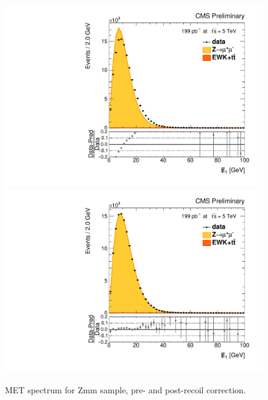 \begin{figure}
\centering
\includegraphics[width=0.49\linewidth]{plots/Recoil/close_nocorr_13/fitmetp.pdf}
\includegraphics[width=0.49\linewidth]{plots/Recoil/close_corr_13/fitmetp.pdf}
\caption{MET spectrum for Zmm sample, pre- and post-recoil correction.}
\label{fig:recoil:validation:met}
\end{figure}